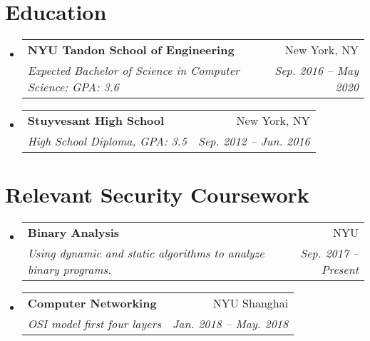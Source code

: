 \documentclass[letterpaper,10pt]{article}
\makeatletter
\newcommand{\resumeSubheading}[4]{
  \item\begin{tabular*}{0.97\textwidth}{l@{\extracolsep{\fill}}r}
      \large\textbf{#1} & #2 \\
      \textit{\small#3} & \textit{\small #4} \\
    \end{tabular*}\vspace{-5pt}
}
\newcommand{\resumeSubHeadingListStart}{\begin{itemize}[leftmargin=*]}
\newcommand{\resumeSubHeadingListEnd}{\end{itemize}}
\makeatother
\begin{document}
\section{Education}

\resumeSubHeadingListStart
  \resumeSubheading
    {NYU Tandon School of Engineering}{New York, NY}
    {Expected Bachelor of Science in Computer Science; GPA: 3.6}{Sep. 2016 -- May 2020}
  \resumeSubheading
    {Stuyvesant High School}{New York, NY}
    {High School Diploma, GPA: 3.5}{Sep. 2012 -- Jun. 2016}
\resumeSubHeadingListEnd

\section{Relevant Security Coursework}
  \resumeSubHeadingListStart
    \resumeSubheading
      {Binary Analysis}{NYU}
      {Using dynamic and static algorithms to analyze binary programs.}{Sep. 2017 -- Present}
    \resumeSubheading
      {Computer Networking}{NYU Shanghai}
      {OSI model first four layers}{Jan. 2018 -- May. 2018}
  \resumeSubHeadingListEnd
\end{document}
